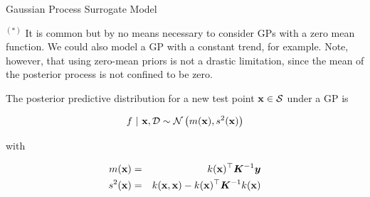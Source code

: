 \documentclass[11pt,compress,t,notes=noshow, xcolor=table]{beamer}
\begin{document}
\begin{vbframe}{Gaussian Process Surrogate Model}
\begin{footnotesize}
 $^{(*)}$ It is common but by no means necessary to consider GPs with a zero mean function. We could also model a GP with a constant trend, for example. Note, however, that using zero-mean priors is not a drastic limitation, since the mean of the posterior process is not confined to be zero. 
\end{footnotesize}

\framebreak 

The posterior predictive distribution for a new test point $\mathbf{x} \in \mathcal{S}$ under a GP is

\begin{eqnarray*}
  f ~|~ \mathbf{x}, \mathcal{D} \sim \mathcal{N}\left(m(\mathbf{x}), s^2(\mathbf{x})\right)
\end{eqnarray*}

with 

\begin{eqnarray*}
  m(\mathbf{x}) &=& k(\mathbf{x})^\top \bm{K}^{-1} \bm{y} \\
  s^2(\mathbf{x}) &=& k(\mathbf{x}, \mathbf{x}) - k(\mathbf{x})^\top \bm{K}^{-1} k(\mathbf{x})
\end{eqnarray*}

\vfill

\end{vbframe}
\end{document}
